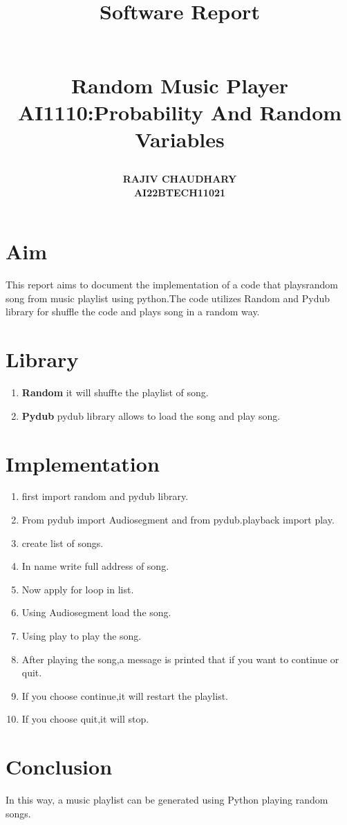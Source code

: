 \documentclass{article}
\title{\begin{Huge}\textbf{Software Report}\end{Huge}\\
        \textbf{Random Music Player}\\
\textbf{AI1110}:Probability And Random Variables}
\author{\textbf{RAJIV CHAUDHARY}\\
\textbf{AI22BTECH11021}}
\date{}
\begin{document}
\maketitle

\section{Aim}
This report aims to document the implementation of a code that playsrandom song from music playlist using python.The code utilizes Random and Pydub library for shuffle the code and plays song in a random way.
\section {Library}
\begin{enumerate}
        \item \textbf{Random} it will shuffte the playlist of song.
        \item \textbf{Pydub} pydub library allows to load the song and play song.
\end{enumerate}
\section{Implementation}
\begin{enumerate}
        \item first import random and pydub library.
        \item From pydub import Audiosegment and from pydub.playback import play.
        \item create list of songs.
        \item In name write full address of song.
        \item Now apply for loop in list.
        \item Using Audiosegment load the song.
        \item Using play to play the song.
        \item After playing the song,a message is printed that if you want to continue or quit.
        \item If you choose continue,it will restart the playlist.
        \item If you choose quit,it will stop.
\end{enumerate}
\section{Conclusion}
In this way, a music playlist can be generated using Python playing random songs.
\end{document}
